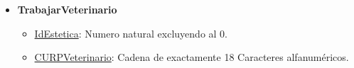 \documentclass{exam}
\begin{document}
\begin{itemize}
	\item \textbf{TrabajarVeterinario}
		\begin{itemize}
			\item \underline{IdEstetica}: Numero natural excluyendo al 0.
			\item \underline{CURPVeterinario}: Cadena de exactamente 18 Caracteres alfanuméricos.
		\end{itemize}	
	
\end{itemize}
\end{document}
